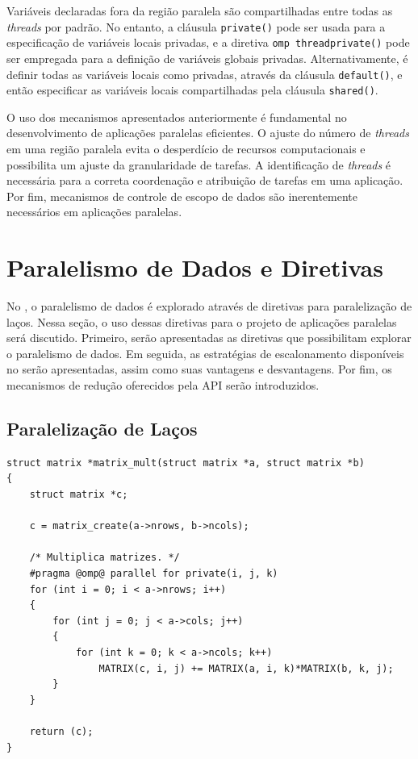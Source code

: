 \documentclass{SBCbookchapter}
\begin{document}
		Variáveis declaradas fora da região paralela são compartilhadas
		entre todas as \textit{threads} por padrão. No entanto, a
		cláusula \texttt{private()} pode ser usada para a especificação
		de variáveis locais privadas, e a diretiva \texttt{omp
		threadprivate()} pode ser empregada para a definição de
		variáveis globais privadas. Alternativamente, é definir todas as
		variáveis locais como privadas, através da cláusula
		\texttt{default()}, e então especificar as variáveis locais
		compartilhadas pela cláusula \texttt{shared()}.

		O uso dos mecanismos apresentados anteriormente é fundamental no
		desenvolvimento de aplicações paralelas eficientes. O ajuste do
		número de \textit{threads} em uma região paralela evita o
		desperdício de recursos computacionais e possibilita um ajuste
		da granularidade de tarefas. A identificação de \textit{threads}
		é necessária para a correta coordenação e atribuição de tarefas
		em uma aplicação. Por fim, mecanismos de controle de escopo de
		dados são inerentemente necessários em aplicações paralelas.

\section{Paralelismo de Dados e Diretivas \openmp}
\label{sec:paralelismo dados}

	No \openmp, o paralelismo de dados é explorado através de diretivas
	para paralelização de laços. Nessa seção, o uso dessas diretivas
	para o projeto de aplicações paralelas será discutido.  Primeiro,
	serão apresentadas as diretivas que possibilitam explorar o
	paralelismo de dados. Em seguida, as estratégias de escalonamento
	disponíveis no \openmp serão apresentadas, assim como suas vantagens e
	desvantagens. Por fim, os mecanismos de redução oferecidos pela API
	\openmp serão introduzidos.

	\subsection{Paralelização de Laços}
	\label{subsection: paralelização de lacos}

\begin{lstlisting}[frame=single,float,floatplacement=b,caption=Paralelização da multiplicação de matrizes no \openmp.,label=listing:matrixmult]
struct matrix *matrix_mult(struct matrix *a, struct matrix *b)
{
	struct matrix *c;

	c = matrix_create(a->nrows, b->ncols);

	/* Multiplica matrizes. */
	#pragma @omp@ parallel for private(i, j, k)
	for (int i = 0; i < a->nrows; i++)
	{
		for (int j = 0; j < a->cols; j++)
		{
			for (int k = 0; k < a->ncols; k++)
				MATRIX(c, i, j) += MATRIX(a, i, k)*MATRIX(b, k, j);
		}
	}

	return (c);
}
\end{lstlisting}
\end{document}
